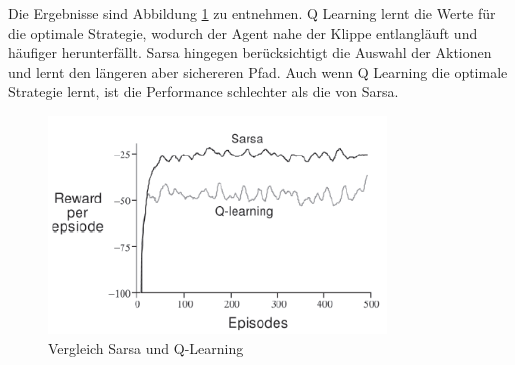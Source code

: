 \documentclass[10pt]{scrartcl}
\begin{document}
Die Ergebnisse sind Abbildung \ref{fig:Cliff_Result} zu entnehmen. Q Learning lernt die Werte für die optimale Strategie, wodurch der Agent nahe der Klippe entlangläuft und häufiger herunterfällt. Sarsa hingegen berücksichtigt die Auswahl der Aktionen und lernt den längeren aber sichereren Pfad. Auch wenn Q Learning die optimale Strategie lernt, ist die Performance schlechter als die von Sarsa.\\

\begin{figure}[htbp]
	\centering	\includegraphics[width=0.8\textwidth]{Bilder/Cliff_Ergebnisse.png}
	\caption{Vergleich Sarsa und Q-Learning}
	\label{fig:Cliff_Result}
\end{figure}


\end{document}
